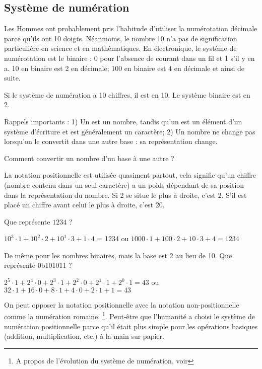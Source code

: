 \subsection{Système de numération}

Les Hommes ont probablement pris l'habitude d'utiliser la numérotation décimale parce qu'ils ont 10 doigts.
Néanmoins, le nombre 10 n'a pas de signification particulière en science et en mathématiques.
En électronique, le système de numérotation est le binaire : 0 pour l'absence de courant dans un fil et 1 s'il y en a.
10 en binaire est 2 en décimale; 100 en binaire est 4 en décimale et ainsi de suite.

Si le système de numération a 10 chiffres, il est en  10. %
Le système binaire est en  2.

Rappels importants :
1) Un  est un nombre, tandis qu'un  est un élément d'un système d'écriture et est généralement un caractère;
2) Un nombre ne change pas lorsqu'on le convertit dans une autre base : sa représentation change.

Comment convertir un nombre d'un base à une autre ?

La notation positionnelle est utilisée quasiment partout, cela signifie qu'un chiffre (nombre contenu dans un seul caractère) a
un poids dépendant de sa position dans la représentation du nombre.
Si 2 se situe le plus à droite, c'est 2.
S'il est placé un chiffre avant celui le plus à droite, c'est 20.

Que représente $1234$ ?

$10^3 \cdot 1 + 10^2 \cdot 2 + 10^1 \cdot 3 + 1 \cdot 4$ = 1234 ou 
$1000 \cdot 1 + 100 \cdot 2 + 10 \cdot 3 + 4 = 1234$

De même pour les nombres binaires, mais la base est 2 au lieu de 10.
Que représente 0b101011 ?

$2^5 \cdot 1 + 2^4 \cdot 0 + 2^3 \cdot 1 + 2^2 \cdot 0 + 2^1 \cdot 1 + 2^0 \cdot 1 = 43$ ou
$32 \cdot 1 + 16 \cdot 0 + 8 \cdot 1 + 4 \cdot 0 + 2 \cdot 1 + 1 = 43$

On peut opposer la notation positionnelle avec la notation non-positionnelle comme la numération romaine.
\footnote{A propos de l'évolution du système de numération, voir }.
Peut-être que l'humanité a choisi le système de numération positionnelle parce qu'il était plus simple pour les opérations basiques (addition, multiplication, etc.) à la main sur papier.

